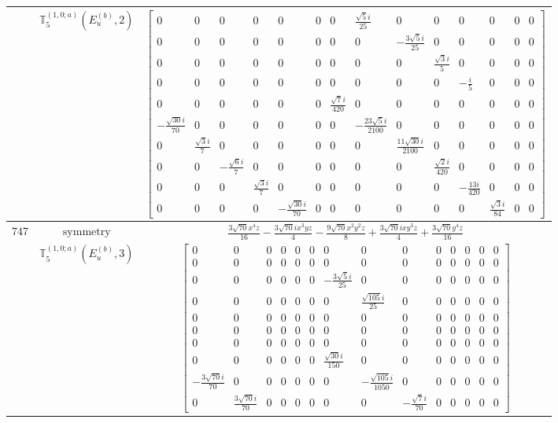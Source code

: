\documentclass[fleqn,8pt,landscape]{jsarticle}
\begin{document}
\begin{longtable}{ccc}
$  $ & $ \mathbb{T}_{5}^{(1,0;a)}(E_{u}^{(b)},2) $ & $ \begin{bmatrix} 0 & 0 & 0 & 0 & 0 & 0 & 0 & \frac{\sqrt{5} i}{25} & 0 & 0 & 0 & 0 & 0 & 0 \\ 0 & 0 & 0 & 0 & 0 & 0 & 0 & 0 & - \frac{3 \sqrt{5} i}{25} & 0 & 0 & 0 & 0 & 0 \\ 0 & 0 & 0 & 0 & 0 & 0 & 0 & 0 & 0 & \frac{\sqrt{3} i}{5} & 0 & 0 & 0 & 0 \\ 0 & 0 & 0 & 0 & 0 & 0 & 0 & 0 & 0 & 0 & - \frac{i}{5} & 0 & 0 & 0 \\ 0 & 0 & 0 & 0 & 0 & 0 & \frac{\sqrt{7} i}{420} & 0 & 0 & 0 & 0 & 0 & 0 & 0 \\ - \frac{\sqrt{30} i}{70} & 0 & 0 & 0 & 0 & 0 & 0 & - \frac{23 \sqrt{5} i}{2100} & 0 & 0 & 0 & 0 & 0 & 0 \\ 0 & \frac{\sqrt{3} i}{7} & 0 & 0 & 0 & 0 & 0 & 0 & \frac{11 \sqrt{30} i}{2100} & 0 & 0 & 0 & 0 & 0 \\ 0 & 0 & - \frac{\sqrt{6} i}{7} & 0 & 0 & 0 & 0 & 0 & 0 & \frac{\sqrt{2} i}{420} & 0 & 0 & 0 & 0 \\ 0 & 0 & 0 & \frac{\sqrt{3} i}{7} & 0 & 0 & 0 & 0 & 0 & 0 & - \frac{13 i}{420} & 0 & 0 & 0 \\ 0 & 0 & 0 & 0 & - \frac{\sqrt{30} i}{70} & 0 & 0 & 0 & 0 & 0 & 0 & \frac{\sqrt{3} i}{84} & 0 & 0 \end{bmatrix} $ \\ \hline
$ 747 $ & $ \text{symmetry} $ & $ \frac{3 \sqrt{70} x^{4} z}{16} - \frac{3 \sqrt{70} i x^{3} y z}{4} - \frac{9 \sqrt{70} x^{2} y^{2} z}{8} + \frac{3 \sqrt{70} i x y^{3} z}{4} + \frac{3 \sqrt{70} y^{4} z}{16} $ \\
$  $ & $ \mathbb{T}_{5}^{(1,0;a)}(E_{u}^{(b)},3) $ & $ \begin{bmatrix} 0 & 0 & 0 & 0 & 0 & 0 & 0 & 0 & 0 & 0 & 0 & 0 & 0 & 0 \\ 0 & 0 & 0 & 0 & 0 & 0 & 0 & 0 & 0 & 0 & 0 & 0 & 0 & 0 \\ 0 & 0 & 0 & 0 & 0 & 0 & - \frac{3 \sqrt{5} i}{25} & 0 & 0 & 0 & 0 & 0 & 0 & 0 \\ 0 & 0 & 0 & 0 & 0 & 0 & 0 & \frac{\sqrt{105} i}{25} & 0 & 0 & 0 & 0 & 0 & 0 \\ 0 & 0 & 0 & 0 & 0 & 0 & 0 & 0 & 0 & 0 & 0 & 0 & 0 & 0 \\ 0 & 0 & 0 & 0 & 0 & 0 & 0 & 0 & 0 & 0 & 0 & 0 & 0 & 0 \\ 0 & 0 & 0 & 0 & 0 & 0 & 0 & 0 & 0 & 0 & 0 & 0 & 0 & 0 \\ 0 & 0 & 0 & 0 & 0 & 0 & \frac{\sqrt{30} i}{150} & 0 & 0 & 0 & 0 & 0 & 0 & 0 \\ - \frac{3 \sqrt{70} i}{70} & 0 & 0 & 0 & 0 & 0 & 0 & - \frac{\sqrt{105} i}{1050} & 0 & 0 & 0 & 0 & 0 & 0 \\ 0 & \frac{3 \sqrt{70} i}{70} & 0 & 0 & 0 & 0 & 0 & 0 & - \frac{\sqrt{7} i}{70} & 0 & 0 & 0 & 0 & 0 \end{bmatrix} $ \\ \hline

\end{longtable}
\end{document}
